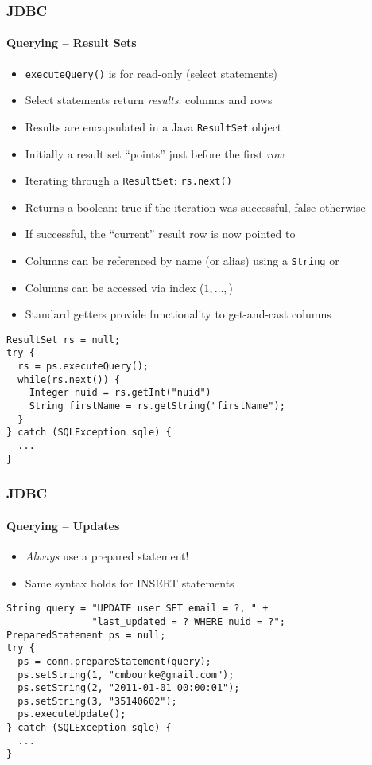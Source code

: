 \documentclass{beamer}
\begin{document}
\begin{frame}
  \frametitle{JDBC}
  \framesubtitle{Querying -- Result Sets}

\begin{itemize}
  \item \texttt{executeQuery()} is for read-only (select statements)
  \item Select statements return \emph{results}: columns and rows
  \item Results are encapsulated in a Java \texttt{ResultSet} object
  \item Initially a result set ``points'' just before the first \emph{row}
  \item Iterating through a \texttt{ResultSet}: \texttt{rs.next()} 
  \item Returns a boolean: true if the iteration was successful, false otherwise
  \item If successful, the ``current'' result row is now pointed to
  \item Columns can be referenced by name (or alias) using a \texttt{String} or
  \item Columns can be accessed via index ($1, \ldots, $)
  \item Standard getters provide functionality to get-and-cast columns
\end{itemize}

\begin{verbatim}
ResultSet rs = null;
try {
  rs = ps.executeQuery();
  while(rs.next()) {
    Integer nuid = rs.getInt("nuid")
    String firstName = rs.getString("firstName");
  }
} catch (SQLException sqle) {
  ...
}
\end{verbatim}

\end{frame}

\begin{frame}[fragile]
  \frametitle{JDBC}
  \framesubtitle{Querying -- Updates}

\begin{itemize}
  \item \emph{Always} use a prepared statement!
  \item Same syntax holds for INSERT statements
\end{itemize}

\begin{verbatim}
String query = "UPDATE user SET email = ?, " +
               "last_updated = ? WHERE nuid = ?";
PreparedStatement ps = null;
try {
  ps = conn.prepareStatement(query);
  ps.setString(1, "cmbourke@gmail.com");
  ps.setString(2, "2011-01-01 00:00:01");
  ps.setString(3, "35140602");
  ps.executeUpdate();
} catch (SQLException sqle) {
  ...
}
\end{verbatim}

\end{frame}
\end{document}
